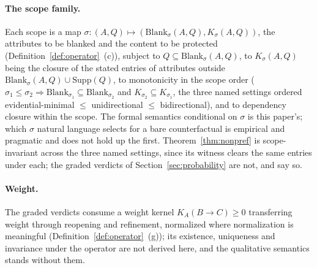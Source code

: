 \paragraph{The scope family.} Each scope is a map $\sigma : (A, Q) \mapsto (\mathrm{Blank}_\sigma(A, Q), K_\sigma(A, Q))$, the attributes to be blanked and the content to be protected (Definition~\ref{def:operator}~(c)), subject to $Q \subseteq \mathrm{Blank}_\sigma(A, Q)$, to $K_\sigma(A, Q)$ being the closure of the stated entries of attributes outside $\mathrm{Blank}_\sigma(A, Q) \cup \mathrm{Supp}(Q)$, to monotonicity in the scope order ($\sigma_1 \le \sigma_2 \Rightarrow \mathrm{Blank}_{\sigma_1} \subseteq \mathrm{Blank}_{\sigma_2}$ and $K_{\sigma_2} \subseteq K_{\sigma_1}$, the three named settings ordered evidential-minimal $\le$ unidirectional $\le$ bidirectional), and to dependency closure within the scope. The formal semantics conditional on $\sigma$ is this paper's; which $\sigma$ natural language selects for a bare counterfactual is empirical and pragmatic and does not hold up the first. Theorem~\ref{thm:nonpref} is scope-invariant across the three named settings, since its witness clears the same entries under each; the graded verdicts of Section~\ref{sec:probability} are not, and say so.

\paragraph{Weight.} The graded verdicts consume a weight kernel $K_A(B \to C) \ge 0$ transferring weight through reopening and refinement, normalized where normalization is meaningful (Definition~\ref{def:operator}~(g)); its existence, uniqueness and invariance under the operator are not derived here, and the qualitative semantics stands without them.

